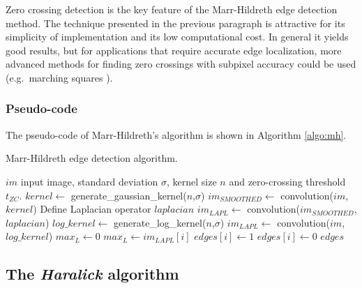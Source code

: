 \documentclass{ipol}
\numberwithin{equation}{section}
\numberwithin{table}{section}
\begin{document}
Zero crossing detection is the key feature of the Marr-Hildreth edge detection method. The technique 
presented in the previous paragraph is attractive for its simplicity of implementation and its low 
computational cost. In general it yields good results, but for applications that require accurate edge localization, more advanced methods for finding zero crossings with subpixel 
accuracy could be used (e.g.\ marching squares \cite{comp_graph:surf_recon:lorensen:87:marching_cubes}).


\subsubsection{Pseudo-code}

The pseudo-code of Marr-Hildreth's algorithm is shown in Algorithm \ref{algo:mh}.

\begin{algorithm}[t!]
\caption{Marr-Hildreth edge detection algorithm.}
\label{algo:mh}
\begin{algorithmic}[1]
\Require $im$ input image, standard deviation $\sigma$, kernel size $n$ and zero-crossing threshold $t_{ZC}$.
	\State $kernel \leftarrow$ generate\_gaussian\_kernel($n$,$\sigma$)
	\State $im_{SMOOTHED} \leftarrow$ convolution($im$,$kernel$)
	\State Define Laplacian operator $laplacian$ 
	\State $im_{LAPL} \leftarrow$ convolution($im_{SMOOTHED}$,$laplacian$)
\Else
\State $log\_kernel \leftarrow$ generate\_log\_kernel($n$,$\sigma$)
\State $im_{LAPL} \leftarrow$ convolution($im$,$log\_kernel$)
\EndIf
\State $max_L \leftarrow 0$
		\State $max_L \leftarrow im_{LAPL}[i]$
	\EndIf
\EndFor
{}
			\State $edges[i] \leftarrow 1$
		\Else
			\State $edges[i] \leftarrow 0$
		\EndIf
	\EndFor
\EndFor
\Return $edges$
\end{algorithmic}
\end{algorithm}


\subsection{The \textit{Haralick} algorithm}
\end{document}
